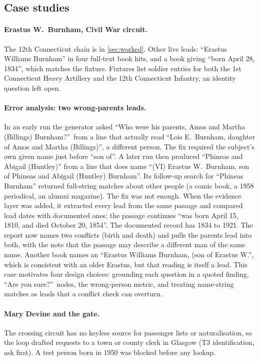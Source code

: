\subsection{Case studies}
\label{sec:cases}
\paragraph{Erastus W.\ Burnham, Civil War circuit.} The 12th Connecticut chain is in \cref{sec:worked}. Other live leads: ``Erastus Williams Burnham'' in four full-text book hits, and a book giving ``born April 28, 1834'', which matches the fixture. Fixtures list soldier entries for both the 1st Connecticut Heavy Artillery and the 12th Connecticut Infantry, an identity question left open.

\label{sec:wrongparents}
\paragraph{Error analysis: two wrong-parents leads.} In an early run the generator asked ``Who were his parents, Amos and Martha (Billings) Burnham?''\ from a line that actually read ``Lois E.\ Burnham, daughter of Amos and Martha (Billings)'', a different person. The fix required the subject's own given name just before ``son of''. A later run then produced ``Phineas and Abigail (Huntley)'' from a line that does name ``(VI) Erastus W.\ Burnham, son of Phineas and Abigail (Huntley) Burnham''. Its follow-up search for ``Phineas Burnham'' returned full-string matches about other people (a comic book, a 1958 periodical, an alumni magazine). The fix was not enough. When the evidence layer was added, it extracted every lead from the same passage and compared lead dates with documented ones: the passage continues ``was born April 15, 1810, and died October 20, 1854''. The documented record has 1834 to 1921. The report now names two conflicts (birth and death) and pulls the parents lead into both, with the note that the passage may describe a different man of the same name. Another book names an ``Erastus Williams Burnham, (son of Erastus W.'', which is consistent with an older Erastus, but that reading is itself a lead. This case motivates four design choices: grounding each question in a quoted finding, ``Are you sure?''\ nodes, the wrong-person metric, and treating name-string matches as leads that a conflict check can overturn.

\paragraph{Mary Devine and the gate.} The crossing circuit has no keyless source for passenger lists or naturalisation, so the loop drafted requests to a town or county clerk in Glasgow (T3 identification, ask first). A test person born in 1950 was blocked before any lookup.

